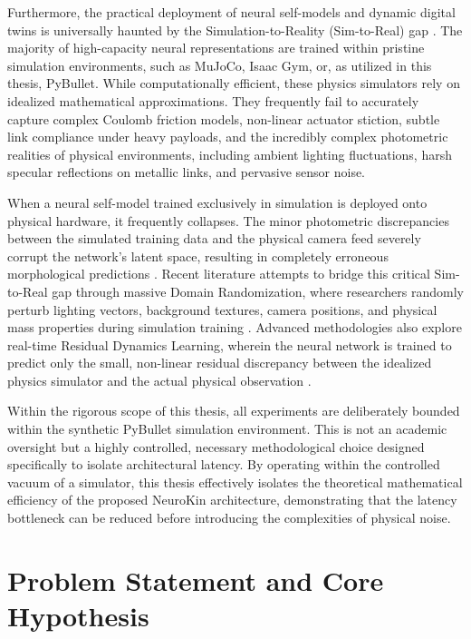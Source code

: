 \documentclass[12pt,a4paper,oneside]{report}
\begin{document}
Furthermore, the practical deployment of neural self-models and dynamic digital twins is universally haunted by the Simulation-to-Reality (Sim-to-Real) gap \cite{tan2018simtoreal, aljalbout2026realitygap}. The majority of high-capacity neural representations are trained within pristine simulation environments, such as MuJoCo, Isaac Gym, or, as utilized in this thesis, PyBullet. While computationally efficient, these physics simulators rely on idealized mathematical approximations. They frequently fail to accurately capture complex Coulomb friction models, non-linear actuator stiction, subtle link compliance under heavy payloads, and the incredibly complex photometric realities of physical environments, including ambient lighting fluctuations, harsh specular reflections on metallic links, and pervasive sensor noise.

When a neural self-model trained exclusively in simulation is deployed onto physical hardware, it frequently collapses. The minor photometric discrepancies between the simulated training data and the physical camera feed severely corrupt the network's latent space, resulting in completely erroneous morphological predictions \cite{rezvani2024robust}. Recent literature attempts to bridge this critical Sim-to-Real gap through massive Domain Randomization, where researchers randomly perturb lighting vectors, background textures, camera positions, and physical mass properties during simulation training \cite{tan2018simtoreal}. Advanced methodologies also explore real-time Residual Dynamics Learning, wherein the neural network is trained to predict only the small, non-linear residual discrepancy between the idealized physics simulator and the actual physical observation \cite{qiu2024swim2real, lim2025splat2real}.

Within the rigorous scope of this thesis, all experiments are deliberately bounded within the synthetic PyBullet simulation environment. This is not an academic oversight but a highly controlled, necessary methodological choice designed specifically to isolate architectural latency. By operating within the controlled vacuum of a simulator, this thesis effectively isolates the theoretical mathematical efficiency of the proposed NeuroKin architecture, demonstrating that the latency bottleneck can be reduced before introducing the complexities of physical noise.

\section{Problem Statement and Core Hypothesis}
\end{document}
